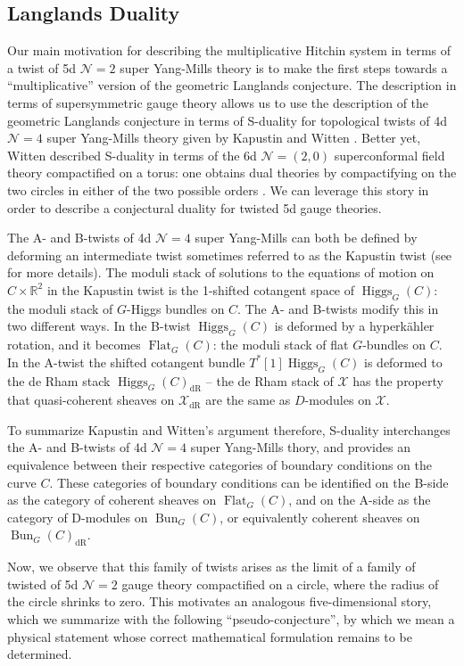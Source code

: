 \documentclass[11pt, oneside, reqno]{amsart}
\theoremstyle{definition} \newtheorem{definition}{Definition}[section]
\theoremstyle{definition} \newtheorem{remark}[definition]{Remark}
\theoremstyle{definition} \newtheorem{remarks}[definition]{Remarks}
\theoremstyle{definition} \newtheorem{question}[definition]{Question}
\theoremstyle{definition} \newtheorem*{note}{Note}
\theoremstyle{definition} \newtheorem{example}[definition]{Example}
\theoremstyle{definition} \newtheorem{examples}[definition]{Examples}
\newcommand{\mr}[1]{\mathrm{#1}}
\newcommand{\mc}[1]{\mathcal{#1}}
\newcommand{\RR}{\mathbb{R}}
\DeclareMathOperator{\higgs}{Higgs}
\DeclareMathOperator{\bun}{Bun}
\DeclareMathOperator{\Flat}{Flat}
\begin{document}
\subsection{Langlands Duality} \label{Langlands_section}
Our main motivation for describing the multiplicative Hitchin system in terms of a twist of 5d $\mc N=2$ super Yang-Mills theory is to make the first steps towards a ``multiplicative'' version of the geometric Langlands conjecture.  The description in terms of supersymmetric gauge theory allows us to use the description of the geometric Langlands conjecture in terms of S-duality for topological twists of 4d $\mc N=4$ super Yang-Mills theory given by Kapustin and Witten \cite{KapustinWitten}.  Better yet, Witten described S-duality in terms of the 6d $\mc N=(2,0)$ superconformal field theory compactified on a torus: one obtains dual theories by compactifying on the two circles in either of the two possible orders \cite{Witten6d}.  We can leverage this story in order to describe a conjectural duality for twisted 5d gauge theories. 

The A- and B-twists of 4d $\mc N=4$ super Yang-Mills can both be defined by deforming an intermediate twist sometimes referred to as the Kapustin twist \cite{KapustinHolo} (see \cite{CostelloSUSY, ElliottYoo1} for more details).  The moduli stack of solutions to the equations of motion on $C \times \RR^2$ in the Kapustin twist is the 1-shifted cotangent space of $\higgs_G(C)$: the moduli stack of $G$-Higgs bundles on $C$.  The A- and B-twists modify this in two different ways.  In the B-twist $\higgs_G(C)$ is deformed by a hyperk\"ahler rotation, and it becomes $\Flat_G(C)$: the moduli stack of flat $G$-bundles on $C$.  In the A-twist the shifted cotangent bundle $T^*[1]\higgs_G(C)$ is deformed to the de Rham stack $\higgs_G(C)_{\mr{dR}}$ -- the de Rham stack of $\mc X$ has the property that quasi-coherent sheaves on $\mc X_{\mr{dR}}$ are the same as $D$-modules on $\mc X$.  

To summarize Kapustin and Witten's argument therefore, S-duality interchanges the A- and B-twists of 4d $\mc N=4$ super Yang-Mills thory,  and provides an equivalence between their respective categories of boundary conditions on the curve $C$.  These categories of boundary conditions can be identified on the B-side as the category of coherent sheaves on $\Flat_G(C)$, and on the A-side as the category of D-modules on $\bun_G(C)$, or equivalently coherent sheaves on $\bun_G(C)_{\mr{dR}}$.

Now, we observe that this family of twists arises as the limit of a family of twisted of 5d $\mc N=2$ gauge theory compactified on a circle, where the radius of the circle shrinks to zero.  This motivates an analogous five-dimensional story, which we summarize with the following ``pseudo-conjecture'', by which we mean a physical statement whose correct mathematical formulation remains to be determined.
\end{document}
